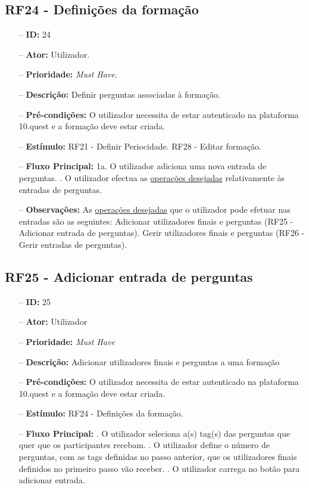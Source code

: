 \subsection{RF24 - Definições da formação}
\begin{itemize}
	\item[--] \textbf{ID:} 24
	\item[--]  \textbf{Ator:} Utilizador.
	\item[--]  \textbf{Prioridade:} \textit{Must Have}.
	\item[--]  \textbf{Descrição:} Definir perguntas associadas à formação.
	\item[--]  \textbf{Pré-condições:} O utilizador necessita de estar autenticado na plataforma 10.quest e a formação deve estar criada.
	\item[--]  \textbf{Estímulo:}
	\subitem RF21 - Definir Periocidade.
	\subitem RF28 - Editar formação.
	\item[--]  \textbf{Fluxo Principal:} 
	\subitem 1a. O utilizador adiciona uma nova entrada de perguntas.
	. O utilizador efectua as \underline{operações desejadas} relativamente às entradas de perguntas.
	\item[--]  \textbf{Observações:} As \underline{operações desejadas} que o utilizador pode efetuar nas entradas são as seguintes:
		\subitem Adicionar utilizadores finais e perguntas (RF25 - Adicionar entrada de perguntas).
		\subitem Gerir utilizadores finais e perguntas (RF26 - Gerir entradas de perguntas).
\end{itemize}
\newpage

\subsection{RF25 - Adicionar entrada de perguntas}
\begin{itemize}
	\item[--] \textbf{ID:} 25
	\item[--]  \textbf{Ator:} Utilizador
	\item[--]  \textbf{Prioridade:} \textit{Must Have}
	\item[--]  \textbf{Descrição:} Adicionar utilizadores finais e perguntas a uma formação
	\item[--]  \textbf{Pré-condições:} O utilizador necessita de estar autenticado na plataforma 10.quest e a formação deve estar criada.
	\item[--]  \textbf{Estímulo:} RF24 - Definições da formação.
	\item[--]  \textbf{Fluxo Principal:} 
		. O utilizador seleciona a(s) tag(s) das perguntas que quer que os participantes recebam.
		. O utilizador define o número de perguntas, com as tags definidas no passo anterior, que os utilizadores finais definidos no primeiro passo vão receber.
		. O utilizador carrega no botão para adicionar entrada.
\end{itemize}
\newpage

